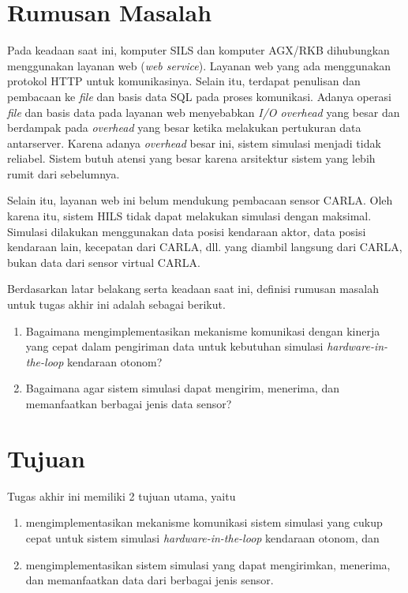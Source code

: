 \section{Rumusan Masalah}

Pada keadaan saat ini, komputer SILS dan komputer AGX/RKB dihubungkan
menggunakan layanan web (\textit{web service}). Layanan web yang ada menggunakan
protokol HTTP untuk komunikasinya. Selain itu, terdapat penulisan dan pembacaan
ke \textit{file} dan basis data SQL pada proses komunikasi. Adanya operasi
\textit{file} dan basis data pada layanan web menyebabkan \textit{I/O overhead}
yang besar dan berdampak pada \textit{overhead} yang besar ketika melakukan
pertukuran data antarserver. Karena adanya \textit{overhead} besar ini, sistem
simulasi menjadi tidak reliabel. Sistem butuh atensi yang besar karena
arsitektur sistem yang lebih rumit dari sebelumnya.

Selain itu, layanan web ini belum mendukung pembacaan sensor CARLA. Oleh karena
itu, sistem HILS tidak dapat melakukan simulasi dengan maksimal. Simulasi
dilakukan menggunakan data posisi kendaraan aktor, data posisi kendaraan lain,
kecepatan dari CARLA, dll. yang diambil langsung dari CARLA, bukan data dari
sensor virtual CARLA.

Berdasarkan latar belakang serta keadaan saat ini, definisi rumusan masalah
untuk tugas akhir ini adalah sebagai berikut.
\begin{enumerate}
	\item Bagaimana mengimplementasikan mekanisme komunikasi dengan kinerja
	      yang cepat dalam pengiriman data untuk kebutuhan simulasi
	      \textit{hardware-in-the-loop} kendaraan otonom?
	\item Bagaimana agar sistem simulasi dapat mengirim, menerima, dan
	      memanfaatkan berbagai jenis data sensor?
\end{enumerate}

\section{Tujuan}

Tugas akhir ini memiliki 2 tujuan utama, yaitu
\begin{enumerate}
	\item mengimplementasikan mekanisme komunikasi sistem simulasi yang cukup
	      cepat untuk sistem simulasi \textit{hardware-in-the-loop} kendaraan
	      otonom, dan
	\item mengimplementasikan sistem simulasi yang dapat mengirimkan,
	      menerima, dan memanfaatkan data dari berbagai jenis sensor.
\end{enumerate}

